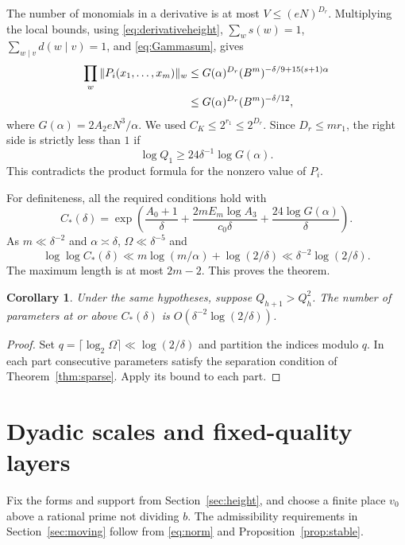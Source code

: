 \documentclass[11pt]{article}
\numberwithin{equation}{section}
\newtheorem{corollary}[theorem]{Corollary}
\theoremstyle{remark}\newtheorem{remark}[theorem]{Remark}
\begin{document}
The number of monomials in a derivative is at most
$V\le(eN)^{D_r}$. Multiplying the local bounds, using
\eqref{eq:derivativeheight}, $\sum_ws(w)=1$,
$\sum_{w\mid v}d(w\mid v)=1$, and \eqref{eq:Gammasum}, gives
\begin{align}
 \prod_w\|P_i(x_1,\ldots,x_m)\|_w
 &\le G(\alpha)^{D_r}
       (B^m)^{-\delta/9+15(s+1)\alpha}\notag\\
 &\le G(\alpha)^{D_r}(B^m)^{-\delta/12},\label{eq:product}
\end{align}
where $G(\alpha)=2A_2eN^3/\alpha$. We used
$C_K\le2^{r_1}\le2^{D_r}$.
Since $D_r\le mr_1$, the right side is strictly less than $1$ if
\begin{equation}\label{eq:cutofftwo}
 \log Q_1\ge24\delta^{-1}\log G(\alpha).
\end{equation}
This contradicts the product formula for the nonzero value of $P_i$.

For definiteness, all the required conditions hold with
\begin{equation}\label{eq:explicitcutoff}
 C_*(\delta)=\exp\left(
 \frac{A_0+1}{\delta}
 +\frac{2mE_m\log A_3}{c_0\delta}
 +\frac{24\log G(\alpha)}{\delta}\right).
\end{equation}
As $m\ll\delta^{-2}$ and $\alpha\asymp\delta$,
$\Omega\ll\delta^{-5}$ and
\[
 \log\log C_*(\delta)
 \ll m\log(m/\alpha)+\log(2/\delta)
 \ll\delta^{-2}\log(2/\delta).
\]
The maximum length is at most $2m-2$. This proves the theorem.

\begin{corollary}\label{cor:count}
Under the same hypotheses, suppose $Q_{h+1}>Q_h^2$.
The number of parameters at or above $C_*(\delta)$ is
$O(\delta^{-2}\log(2/\delta))$.
\end{corollary}
\begin{proof}
Set $q=\lceil\log_2\Omega\rceil\ll\log(2/\delta)$ and partition the
indices modulo $q$. In each part consecutive parameters satisfy the
separation condition of Theorem~\ref{thm:sparse}. Apply its bound to
each part.
\end{proof}

\section{Dyadic scales and fixed-quality layers}\label{sec:layers}
Fix the forms and support from Section~\ref{sec:height}, and choose
a finite place $v_0$ above a rational prime not dividing $b$.
The admissibility requirements in Section~\ref{sec:moving} follow
from \eqref{eq:norm} and Proposition~\ref{prop:stable}.
\end{document}
